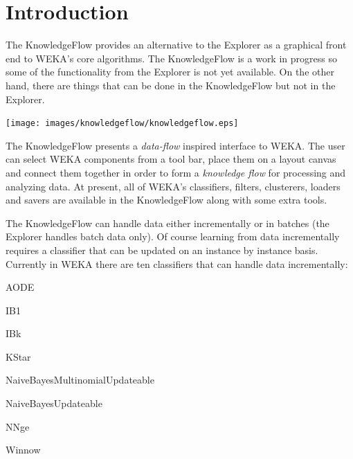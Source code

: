 %
%
%
%



\section{Introduction}

The KnowledgeFlow provides an alternative to the Explorer as a
graphical front end to WEKA's core algorithms. The KnowledgeFlow is a
work in progress so some of the functionality from the Explorer is not
yet available. On the other hand, there are things that can be done in
the KnowledgeFlow but not in the Explorer.

\begin{center}
  \texttt{[image: images/knowledgeflow/knowledgeflow.eps]}
\end{center}

The KnowledgeFlow presents a \textit{data-flow} inspired interface to
WEKA. The user can select WEKA components from a tool bar, place them
on a layout canvas and connect them together in order to form a
\textit{knowledge flow} for processing and analyzing data. At present, all of
WEKA's classifiers, filters, clusterers, loaders and savers are
available in the KnowledgeFlow along with some extra tools.

The KnowledgeFlow can handle data either incrementally or in batches
(the Explorer handles batch data only). Of course learning from data
incrementally requires a classifier that can be updated on an instance
by instance basis. Currently in WEKA there are ten classifiers that
can handle data incrementally:
\begin{tight_itemize}
	\item AODE
	\item IB1
	\item IBk
	\item KStar
	\item NaiveBayesMultinomialUpdateable
	\item NaiveBayesUpdateable
	\item NNge
	\item Winnow
\end{tight_itemize}

